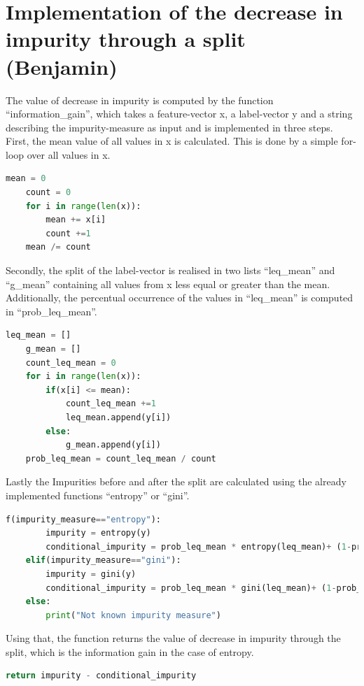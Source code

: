 \documentclass[12pt,a4paper]{scrartcl}		%
\begin{document}
\section{Implementation of the decrease in impurity through a split (Benjamin) }
The value of decrease in impurity is computed by the function “information\_gain”, which takes a feature-vector x, 
a label-vector y and a string describing the impurity-measure as input and is implemented in three steps. 
First, the mean value of all values in x is calculated. This is done by a simple for-loop over all values in x.

\begin{lstlisting}[language=Python]
    mean = 0
    count = 0
    for i in range(len(x)):
        mean += x[i]
        count +=1
    mean /= count
\end{lstlisting}

Secondly, the split of the label-vector is realised in two lists “leq\_mean” and “g\_mean” containing all 
values from x less equal or greater than the mean. Additionally, the percentual occurrence of the values 
in “leq\_mean” is computed in “prob\_leq\_mean”.

\begin{lstlisting}[language=Python]
    leq_mean = []
    g_mean = []
    count_leq_mean = 0
    for i in range(len(x)):
        if(x[i] <= mean):
            count_leq_mean +=1
            leq_mean.append(y[i])
        else:
            g_mean.append(y[i])
    prob_leq_mean = count_leq_mean / count
\end{lstlisting}

Lastly the Impurities before and after the split are calculated using the already implemented functions 
“entropy” or “gini”.

\begin{lstlisting}[language=Python]
    f(impurity_measure=="entropy"):
        impurity = entropy(y)
        conditional_impurity = prob_leq_mean * entropy(leq_mean)+ (1-prob_leq_mean) * entropy(g_mean)
    elif(impurity_measure=="gini"):
        impurity = gini(y)
        conditional_impurity = prob_leq_mean * gini(leq_mean)+ (1-prob_leq_mean) * gini(g_mean) 
    else:
        print("Not known impurity measure")

\end{lstlisting}

Using that, the function returns the value of decrease in impurity through the split, which is the 
information gain in the case of entropy.
 
\begin{lstlisting}[language=Python]
    return impurity - conditional_impurity
\end{lstlisting}
\end{document}
